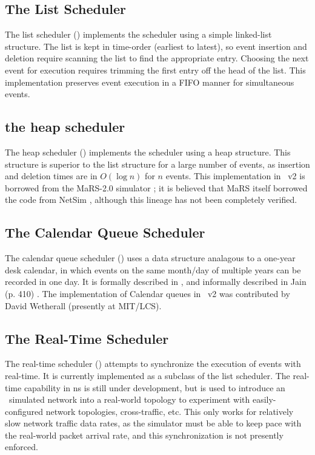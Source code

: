 \subsection{The List Scheduler}
\label{sec:listsched}

The list scheduler ()
implements the scheduler using a simple linked-list structure.
The list is kept in time-order (earliest to latest), so event
insertion and deletion require scanning the list to find the
appropriate entry.
Choosing the next event for execution requires trimming the first
entry off the head of the list.
This implementation preserves event execution in a FIFO manner
for simultaneous events.

\subsection{the heap scheduler}
\label{sec:heapsched}

The heap scheduler ()
implements the scheduler using a heap structure.
This structure is superior to the list structure for a large number
of events, as insertion and deletion times are in $O(\log n)$
for $n$ events.
This implementation in \ns~v2 is borrowed from the
MaRS-2.0 simulator \cite{Alae94:Design};
it is believed that MaRS itself borrowed the code
from NetSim \cite{Heyb89:Netsim},
although this lineage has not been completely verified.

\subsection{The Calendar Queue Scheduler}
\label{sec:cqsched}

The calendar queue scheduler
()
uses a data structure analagous to a one-year desk calendar,
in which events on the same month/day of multiple years can be recorded in
one day.
It is formally described in \cite{Brow88:Calendar}, and informally described
in Jain (p. 410) \cite{Jain91:Art}.
The implementation of Calendar queues in \ns~v2
was contributed by David Wetherall (presently at MIT/LCS).

\subsection{The Real-Time Scheduler}
\label{sec:rtsched}

The real-time scheduler ()
attempts to synchronize the execution of events with real-time.
It is currently implemented as a subclass of the list scheduler.
The real-time capability in ns is still under development, but is used
to introduce an \ns\ simulated network into a real-world topology
to experiment with easily-configured network topologies, cross-traffic, etc. 
This only works for relatively slow network traffic data rates, as the
simulator must be able to keep pace with the real-world packet arrival
rate, and this synchronization is not presently enforced.

